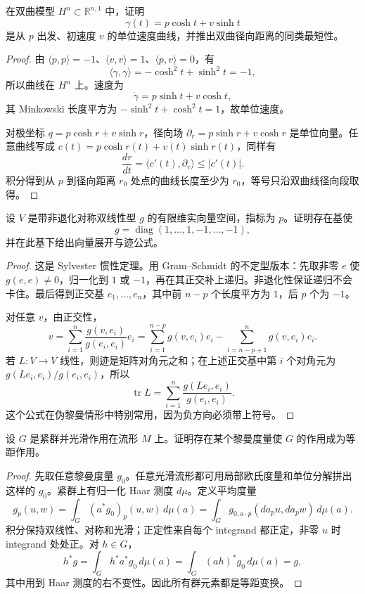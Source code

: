\documentclass[11pt,a4paper,openany]{ctexbook}
\numberwithin{equation}{chapter}
\begin{document}
\begin{problem}
在双曲模型 \(H^n\subset\mathbb R^{n,1}\) 中，证明
\[
\gamma(t)=p\cosh t+v\sinh t
\]
是从 \(p\) 出发、初速度 \(v\) 的单位速度曲线，并推出双曲径向距离的同类最短性。
\end{problem}
\begin{proof}
由 \(\langle p,p\rangle=-1\)、\(\langle v,v\rangle=1\)、\(\langle p,v\rangle=0\)，有
\[
\langle \gamma,\gamma\rangle=-\cosh^2t+\sinh^2t=-1,
\]
所以曲线在 \(H^n\) 上。速度为
\[
\dot\gamma=p\sinh t+v\cosh t,
\]
其 Minkowski 长度平方为 \(-\sinh^2t+\cosh^2t=1\)，故单位速度。

对极坐标 \(q=p\cosh r+v\sinh r\)，径向场 \(\partial_r=p\sinh r+v\cosh r\) 是单位向量。任意曲线写成 \(c(t)=p\cosh r(t)+v(t)\sinh r(t)\)，同样有
\[
\frac{dr}{dt}=\langle c'(t),\partial_r\rangle\le |c'(t)|.
\]
积分得到从 \(p\) 到径向距离 \(r_0\) 处点的曲线长度至少为 \(r_0\)，等号只沿双曲线径向段取得。
\end{proof}

\begin{problem}
设 \(V\) 是带非退化对称双线性型 \(g\) 的有限维实向量空间，指标为 \(p\)。证明存在基使
\[
g=\operatorname{diag}(1,\ldots,1,-1,\ldots,-1),
\]
并在此基下给出向量展开与迹公式。
\end{problem}
\begin{proof}
这是 Sylvester 惯性定理。用 Gram--Schmidt 的不定型版本：先取非零 \(e\) 使 \(g(e,e)\ne0\)，归一化到 \(1\) 或 \(-1\)，再在其正交补上递归。非退化性保证递归不会卡住。最后得到正交基 \(e_1,\ldots,e_n\)，其中前 \(n-p\) 个长度平方为 \(1\)，后 \(p\) 个为 \(-1\)。

对任意 \(v\)，由正交性，
\[
v=\sum_{i=1}^n\frac{g(v,e_i)}{g(e_i,e_i)}e_i
=\sum_{i=1}^{n-p}g(v,e_i)e_i-\sum_{i=n-p+1}^n g(v,e_i)e_i.
\]
若 \(L\colon V\to V\) 线性，则迹是矩阵对角元之和；在上述正交基中第 \(i\) 个对角元为 \(g(L e_i,e_i)/g(e_i,e_i)\)，所以
\[
\operatorname{tr}L=\sum_{i=1}^n\frac{g(Le_i,e_i)}{g(e_i,e_i)}.
\]
这个公式在伪黎曼情形中特别常用，因为负方向必须带上符号。
\end{proof}

\begin{problem}
设 \(G\) 是紧群并光滑作用在流形 \(M\) 上。证明存在某个黎曼度量使 \(G\) 的作用成为等距作用。
\end{problem}
\begin{proof}
先取任意黎曼度量 \(g_0\)。任意光滑流形都可用局部欧氏度量和单位分解拼出这样的 \(g_0\)。紧群上有归一化 Haar 测度 \(d\mu\)。定义平均度量
\[
g_p(u,w)=\int_G (a^*g_0)_p(u,w)\,d\mu(a)
=\int_G g_{0,a\cdot p}(da_pu,da_pw)\,d\mu(a).
\]
积分保持双线性、对称和光滑；正定性来自每个 integrand 都正定，非零 \(u\) 时 integrand 处处正。对 \(h\in G\)，
\[
h^*g=\int_G h^*a^*g_0\,d\mu(a)=\int_G (ah)^*g_0\,d\mu(a)=g,
\]
其中用到 Haar 测度的右不变性。因此所有群元素都是等距变换。
\end{proof}
\end{document}
